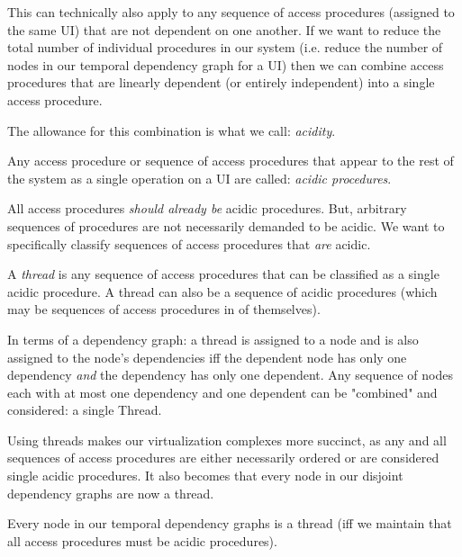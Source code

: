 This can technically also apply to any sequence of access procedures (assigned to the same UI) that are not dependent on one another. If we want to reduce the total number of individual procedures in our system (i.e. reduce the number of nodes in our temporal dependency graph for a UI) then we can combine access procedures that are linearly dependent (or entirely independent) into a single access procedure.

The allowance for this combination is what we call: \textit{acidity}.

\begin{con-def}
	\label{acidic-procedures}
	Any access procedure or sequence of access procedures that appear to the rest of the system as a single operation on a UI are called: \textit{acidic procedures}.
\end{con-def}

All access procedures \textit{should already be} acidic procedures. But, arbitrary sequences of procedures are not necessarily demanded to be acidic. We want to specifically classify sequences of access procedures that \textit{are} acidic.

\begin{con-def}[Thread]
	\label{thread}
	A \textit{thread} is any sequence of access procedures that can be classified as a single acidic procedure. A thread can also be a sequence of acidic procedures (which may be sequences of access procedures in of themselves).
\end{con-def}

In terms of a dependency graph: a thread is assigned to a node and is also assigned to the node's dependencies iff the dependent node has only one dependency \textit{and} the dependency has only one dependent. Any sequence of nodes each with at most one dependency and one dependent can be "combined" and considered: a single Thread.

Using threads makes our virtualization complexes more succinct, as any and all sequences of access procedures are either necessarily ordered or are considered single acidic procedures. It also becomes that every node in our disjoint dependency graphs are now a thread.

\begin{props}
	\label{nodes-are-threads}
	Every node in our temporal dependency graphs is a thread (iff we maintain that all access procedures must be acidic procedures).
\end{props}

